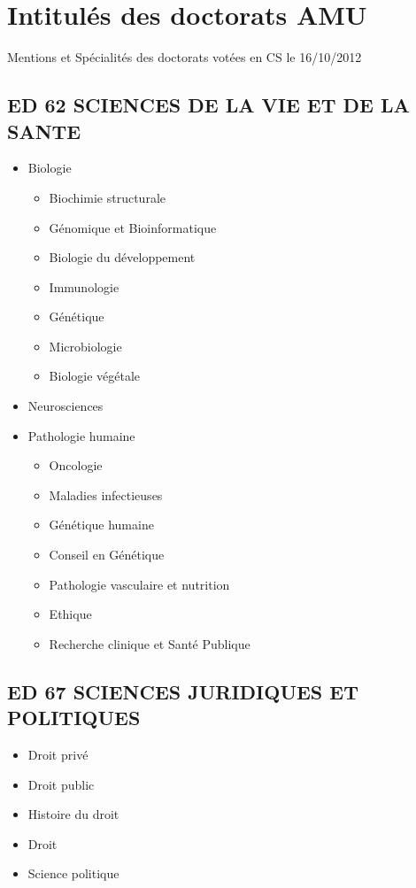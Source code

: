 \section{Intitulés des doctorats AMU}

	Mentions et Spécialités des doctorats votées en CS le 16/10/2012

	\subsection*{ED 62 SCIENCES DE LA VIE ET DE LA SANTE}\label{ed-62-sciences-de-la-vie-et-de-la-sante}

		\begin{itemize}
		\item Biologie
		\begin{itemize}
		\item Biochimie structurale
		\item Génomique et Bioinformatique
		\item Biologie du développement
		\item Immunologie
		\item Génétique
		\item Microbiologie\
		\item Biologie végétale
		\end{itemize}
		\item Neurosciences
		\item Pathologie humaine
		\begin{itemize}
		\item Oncologie
		\item Maladies infectieuses
		\item Génétique humaine
		\item Conseil en Génétique
		\item Pathologie vasculaire et nutrition
		\item Ethique
		\item Recherche clinique et Santé Publique
		\end{itemize}
		\end{itemize}

	\subsection*{ED 67 SCIENCES JURIDIQUES ET POLITIQUES}\label{ed-67-sciences-juridiques-et-politiques}

		\begin{itemize}
		\item Droit privé
		\item Droit public
		\item Histoire du droit
		\item Droit
		\item Science politique
		\end{itemize}

